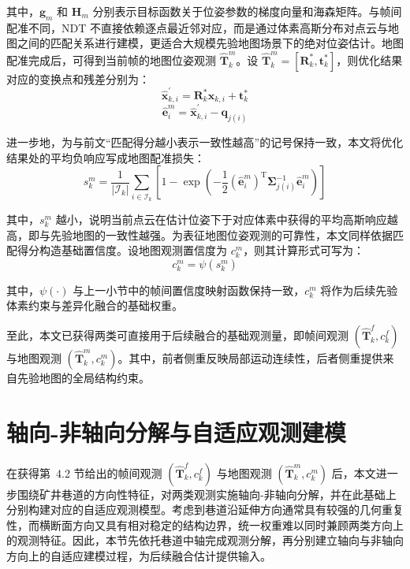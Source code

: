 其中，$\mathbf{g}_{m}$ 和 $\mathbf{H}_{m}$ 分别表示目标函数关于位姿参数的梯度向量和海森矩阵。与帧间配准不同，NDT 不直接依赖逐点最近邻对应，而是通过体素高斯分布对点云与地图之间的匹配关系进行建模，更适合大规模先验地图场景下的绝对位姿估计。地图配准完成后，可得到当前帧的地图位姿观测 $\hat{\mathbf{T}}_{k}^{m}$。设 $\hat{\mathbf{T}}_{k}^{m}=[\mathbf{R}_{k}^{\ast},\mathbf{t}_{k}^{\ast}]$，则优化结果对应的变换点和残差分别为：
\begin{equation}
\hat{\mathbf{x}}_{k,i}^{\prime}
=
\mathbf{R}_{k}^{\ast}\mathbf{x}_{k,i}+\mathbf{t}_{k}^{\ast}
\end{equation}
\begin{equation}
\hat{\mathbf{e}}_{i}^{m}
=
\hat{\mathbf{x}}_{k,i}^{\prime}-\mathbf{q}_{j(i)}
\end{equation}

进一步地，为与前文“匹配得分越小表示一致性越高”的记号保持一致，本文将优化结果处的平均负响应写成地图配准损失：
\begin{equation}
s_{k}^{m}
=
\frac{1}{|\mathcal{I}_{k}|}
\sum_{i\in\mathcal{I}_{k}}
\left[
1-
\exp\left(
-\frac{1}{2}
\left(\hat{\mathbf{e}}_{i}^{m}\right)^{\mathrm{T}}
\boldsymbol{\Sigma}_{j(i)}^{-1}
\hat{\mathbf{e}}_{i}^{m}
\right)
\right]
\end{equation}

其中，$s_{k}^{m}$ 越小，说明当前点云在估计位姿下于对应体素中获得的平均高斯响应越高，即与先验地图的一致性越强。为表征地图位姿观测的可靠性，本文同样依据匹配得分构造基础置信度。设地图观测置信度为 $c_{k}^{m}$，则其计算形式可写为：
\begin{equation}
c_{k}^{m}
=
\psi\!\left(s_{k}^{m}\right)
\end{equation}

其中，$\psi(\cdot)$ 与上一小节中的帧间置信度映射函数保持一致，$c_{k}^{m}$ 将作为后续先验体素约束与差异化融合的基础权重。

至此，本文已获得两类可直接用于后续融合的基础观测量，即帧间观测 $\left(\hat{\mathbf{T}}_{k}^{f},c_{k}^{f}\right)$ 与地图观测 $\left(\hat{\mathbf{T}}_{k}^{m},c_{k}^{m}\right)$。其中，前者侧重反映局部运动连续性，后者侧重提供来自先验地图的全局结构约束。

\section{轴向-非轴向分解与自适应观测建模}

在获得第~4.2 节给出的帧间观测 $\left(\hat{\mathbf{T}}_{k}^{f},c_{k}^{f}\right)$ 与地图观测 $\left(\hat{\mathbf{T}}_{k}^{m},c_{k}^{m}\right)$ 后，本文进一步围绕矿井巷道的方向性特征，对两类观测实施轴向-非轴向分解，并在此基础上分别构建对应的自适应观测模型。考虑到巷道沿延伸方向通常具有较强的几何重复性，而横断面方向又具有相对稳定的结构边界，统一权重难以同时兼顾两类方向上的观测特征。因此，本节先依托巷道中轴完成观测分解，再分别建立轴向与非轴向方向上的自适应建模过程，为后续融合估计提供输入。

